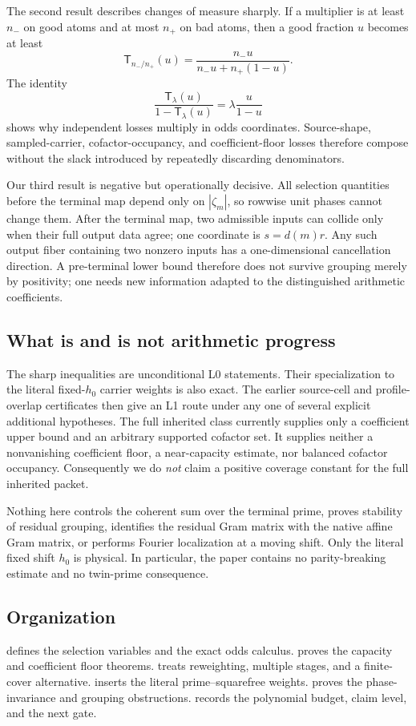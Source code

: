 The second result describes changes of measure sharply.  If a multiplier
is at least \(n_-\) on good atoms and at most \(n_+\) on bad atoms, then a
good fraction \(u\) becomes at least
\[
 \mathsf T_{n_-/n_+}(u)
 =\frac{n_-u}{n_-u+n_+(1-u)}.
\]
The identity
\[
 \frac{\mathsf T_\lambda(u)}{1-\mathsf T_\lambda(u)}
 =\lambda\frac{u}{1-u}
\]
shows why independent losses multiply in odds coordinates.  Source-shape,
sampled-carrier, cofactor-occupancy, and coefficient-floor losses therefore
compose without the slack introduced by repeatedly discarding denominators.

Our third result is negative but operationally decisive.  All selection
quantities before the terminal map depend only on \(|\zeta_m|\), so
rowwise unit phases cannot change them.  After the terminal map, two
admissible inputs can collide only when their full output data agree; one
coordinate is \(s=d(m)r\).  Any such output fiber containing two nonzero
inputs has a one-dimensional cancellation direction.  A
pre-terminal lower bound therefore does not survive grouping merely by
positivity; one needs new information adapted to the distinguished
arithmetic coefficients.

\subsection{What is and is not arithmetic progress}

The sharp inequalities are unconditional L0 statements.  Their
specialization to the literal fixed-\(h_0\) carrier weights is also exact.
The earlier source-cell and profile-overlap certificates then give an L1
route under any one of several explicit additional hypotheses.  The full
inherited class currently supplies only a coefficient upper bound and an
arbitrary supported cofactor set.  It supplies neither a nonvanishing
coefficient floor, a near-capacity estimate, nor balanced cofactor
occupancy.  Consequently we do \emph{not} claim a positive coverage
constant for the full inherited packet.

Nothing here controls the coherent sum over the terminal prime, proves
stability of residual grouping, identifies the residual Gram matrix with
the native affine Gram matrix, or performs Fourier localization at a
moving shift.  Only the literal fixed shift \(h_0\) is physical.  In
particular, the paper contains no parity-breaking estimate and no
twin-prime consequence.

\subsection{Organization}

 defines the selection variables and the exact
odds calculus.   proves the capacity and coefficient
floor theorems.   treats reweighting, multiple stages,
and a finite-cover alternative.   inserts the literal
prime--squarefree weights.   proves the phase-invariance
and grouping obstructions.   records the polynomial
budget, claim level, and the next gate.
